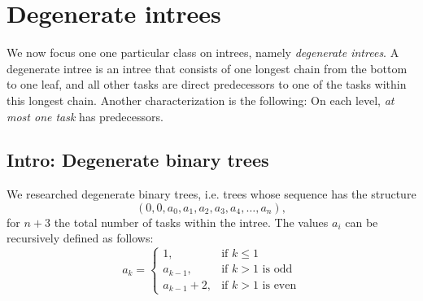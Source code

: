 

\section{Degenerate intrees}
\label{sec:p3-degenerate-intrees}

We now focus one one particular class on intrees, namely \emph{degenerate intrees}. A degenerate intree is an intree that consists of one longest chain from the bottom to one leaf, and all other tasks are direct predecessors to one of the tasks within this longest chain. Another characterization is the following: On each level, \emph{at most one task} has predecessors.

\subsection{Intro: Degenerate binary trees}
\label{sec:p3-degenerate-trees-binary}

We researched degenerate binary trees, i.e. trees whose sequence has the structure
\begin{equation*}
  \left( 0,0,a_0,a_1,a_2,a_3,a_4,\dots,a_n \right),
\end{equation*}
for $n+3$ the total number of tasks within the intree. The values $a_i$ can be recursively defined as follows:
\begin{equation*}
  a_k =
  \begin{cases}
    1, & \text{if } k\leq 1 \\
    a_{k-1}, & \text{if } k>1 \text{ is odd} \\
    a_{k-1}+2, & \text{if } k>1 \text{ is even}
  \end{cases}
\end{equation*}

